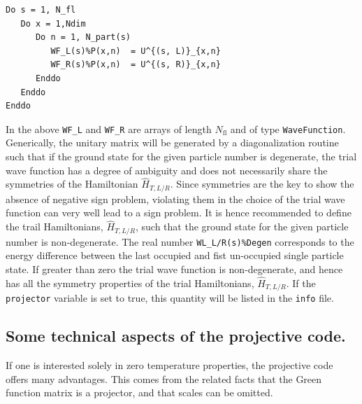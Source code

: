 \lstset{style=fortran}
\begin{lstlisting}
Do s = 1, N_fl
   Do x = 1,Ndim
      Do n = 1, N_part(s)
         WF_L(s)%P(x,n)  = U^{(s, L)}_{x,n}
         WF_R(s)%P(x,n)  = U^{(s, R)}_{x,n}
      Enddo
   Enddo
Enddo
\end{lstlisting}
In the above    \texttt{WF\_L}  and \texttt{WF\_R}  are arrays  of length $N_{\mathrm{fl}}$ and of type \texttt{WaveFunction}.   Generically,   the  unitary matrix    will  be generated by a
diagonalization routine such that  if the ground state for the given particle number is degenerate, the trial wave function  has a degree of ambiguity  and does not necessarily share the symmetries of the Hamiltonian $\hat{H}_{T, L/R}$.   Since symmetries are  the key to show the absence of negative sign problem,   violating them in the choice of the trial wave function can very well lead to a  sign problem.   It is hence recommended to define the  trail Hamiltonians,  $\hat{H}_{T, L/R}$, such that the ground state  for the given  particle number is non-degenerate. The  real number   \texttt{WL\_L/R(s)\%Degen}   corresponds to the energy difference between the last occupied and fist un-occupied single particle state.  If greater than zero  the trial wave function is non-degenerate, and hence has all the symmetry properties of the trial Hamiltonians, $\hat{H}_{T, L/R}$.    If the \texttt{projector}   variable is set to true, this quantity will be listed in the 
\texttt{info}   file. 

\subsection{Some technical aspects of the projective code.}
If one is interested solely in zero temperature properties, the projective code offers many advantages.   This comes from the related facts that the Green function matrix is a projector, and that scales can be omitted. 
  
